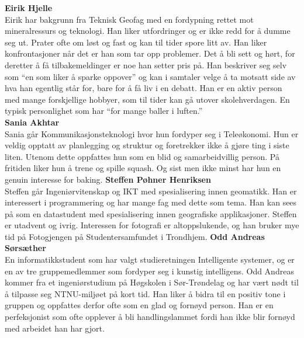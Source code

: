 \documentclass[a4paper,norsk,oneside]{article}
\begin{document}
\textbf{Eirik Hjelle}\\
Eirik har bakgrunn fra Teknisk Geofag med en fordypning rettet mot mineralressurs og teknologi. Han liker utfordringer og er ikke redd for å dumme seg ut. Prater ofte om løst og fast og kan til tider spore litt av. Han liker konfrontasjoner når det er han som tar opp problemer. Det å bli sett og hørt, for deretter å få tilbakemeldinger er noe han setter pris på. Han beskriver seg selv som “en som liker å sparke oppover” og kan i samtaler velge å ta motsatt side av hva han egentlig står for, bare for å få liv i en debatt. Han er en aktiv person med mange forskjellige hobbyer, som til tider kan gå utover skolehverdagen. En typisk personlighet som har “for mange baller i luften.”   \\
\newline
\newline
\textbf{Sania Akhtar}\\
Sania går Kommunikasjonsteknologi hvor hun fordyper seg i Teleøkonomi. Hun er veldig opptatt av planlegging og struktur og foretrekker ikke å gjøre ting i siste liten. Utenom dette oppfattes hun som en blid og samarbeidvillig person. På fritiden liker hun å trene og spille squash. Og sist men ikke minst har hun en genuin interesse for baking. 	
\newline
\newline
\textbf{Steffen Pøhner Henriksen}\\
Steffen går Ingeniørvitenskap og IKT med spesialisering innen geomatikk. Han er interessert i programmering og har mange fag med dette som tema. Han kan sees på som en datastudent med spesialisering innen geografiske applikasjoner. Steffen er utadvent og ivrig. Interessen for fotografi er altoppslukende, og han bruker mye tid på Fotogjengen på Studentersamfundet i Trondhjem.
\newline
\newline
\textbf{Odd Andreas Sørsæther}\\
En informatikkstudent som har valgt studieretningen Intelligente systemer, og er en av tre gruppemedlemmer som fordyper seg i kunstig intelligens. Odd Andreas kommer fra et ingeniørstudium på Høgskolen i Sør-Trøndelag og har vært nødt til å tilpasse seg NTNU-miljøet på kort tid. Han liker å bidra til en positiv tone i gruppen og oppfattes derfor ofte som en glad og fornøyd person. Han er en perfeksjonist som ofte opplever å bli handlingslammet fordi han ikke blir fornøyd med arbeidet han har gjort.
\newline
\newline
\end{document}

